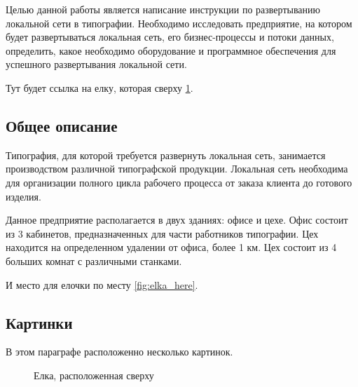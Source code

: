 \documentclass{article}
\begin{document}
Целью данной работы является написание инструкции по развертыванию локальной сети в типографии. Необходимо исследовать предприятие, на котором будет развертываться локальная сеть, его бизнес-процессы и потоки данных, определить, какое необходимо оборудование и программное обеспечения для успешного развертывания локальной сети.\cite{ellis1990annotated}

Тут будет ссылка на елку, которая сверху \ref{fig:elka_top}.

\subsection{Общее описание} \label{s1:s2}

Типография, для которой требуется развернуть локальная сеть, занимается производством различной типографской продукции. Локальная сеть необходима для организации полного цикла рабочего процесса от заказа клиента до готового изделия.\cite{coplien1992advanced}

Данное предприятие располагается в двух зданиях: офисе и цехе. Офис состоит из 3 кабинетов, предназначенных для части работников типографии. Цех находится на определенном удалении от офиса, более 1 км. Цех состоит из 4 больших комнат с различными станками. \cite{barton1994scientific}

И место для елочки по месту \ref{fig:elka_here}.

\newpage

\subsection{Картинки} \label{s1:s3}

В этом параграфе расположенно несколько картинок.

\begin{figure}[t!]
	\caption{Елка, расположенная сверху}
	\label{fig:elka_top}
\end{figure}
\end{document}
